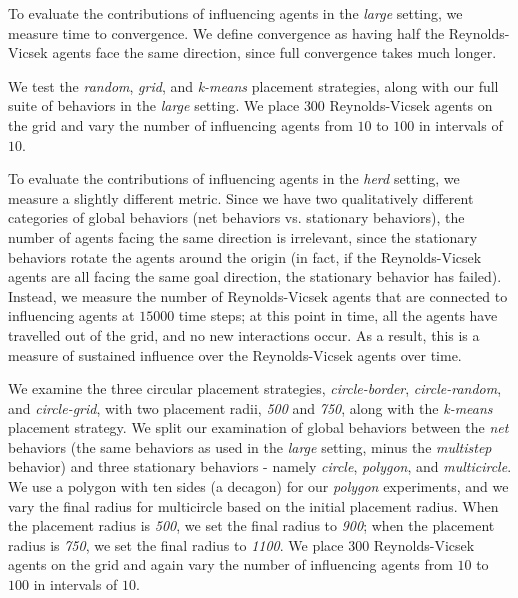 To evaluate the contributions of influencing agents in the \textit{large}
setting, we measure time to convergence.
We define convergence as having half the Reynolds-Vicsek agents face the same
direction, since full convergence takes much longer.

We test the \textit{random}, \textit{grid}, and \textit{k-means} placement
strategies, along with our full suite of behaviors in the \textit{large}
setting.
We place $300$ Reynolds-Vicsek agents on the grid and vary
the number of influencing agents from $10$ to $100$ in intervals of $10$.

To evaluate the contributions of influencing agents in the \textit{herd}
setting, we measure a slightly different metric.
Since we have two qualitatively different categories of global behaviors (net
behaviors vs. stationary behaviors), the number of agents facing the same
direction is irrelevant, since the stationary behaviors rotate the agents around
the origin (in fact, if the Reynolds-Vicsek agents are all facing the same
goal direction, the stationary behavior has failed).
Instead, we measure the number of Reynolds-Vicsek agents that are connected to
influencing agents at $15000$ time steps; at this point in time, all the agents
have travelled out of the grid, and no new interactions occur.
As a result, this is a measure of sustained influence over the Reynolds-Vicsek
agents over time.

We examine the three circular placement strategies, \textit{circle-border},
\textit{circle-random}, and \textit{circle-grid}, with two placement radii,
\textit{500} and \textit{750}, along with the \textit{k-means} placement
strategy.
We split our examination of global behaviors between the \textit{net} behaviors
(the same behaviors as used in the \textit{large} setting, minus the
\textit{multistep} behavior) and three stationary behaviors - namely
\textit{circle}, \textit{polygon}, and \textit{multicircle}.
We use a polygon with ten sides (a decagon) for our \textit{polygon}
experiments, and we vary the final radius for multicircle based on the initial
placement radius.
When the placement radius is \textit{500}, we set the final radius to
\textit{900}; when the placement radius is \textit{750}, we set the final
radius to \textit{1100}.
We place $300$ Reynolds-Vicsek agents on the grid and again vary the number of
influencing agents from $10$ to $100$ in intervals of $10$.

